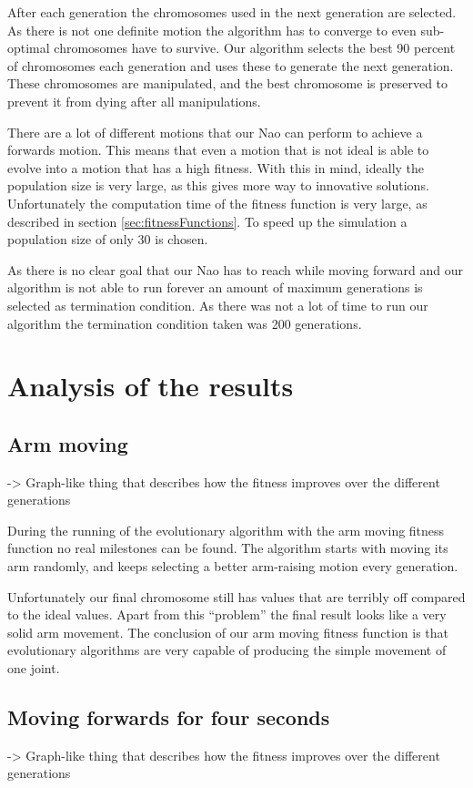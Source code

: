 \documentclass[a4paper,10pt]{article}
\begin{document}
After each generation the chromosomes used in the next generation are selected. As there is not one definite motion the algorithm has to converge to even sub-optimal chromosomes have to survive. Our algorithm selects the best 90 percent of chromosomes each generation and uses these to generate the next generation. These chromosomes are manipulated, and the best chromosome is preserved to prevent it from dying after all manipulations. 

There are a lot of different motions that our Nao can perform to achieve a forwards motion. This means that even a motion that is not ideal is able to evolve into a motion that has a high fitness. With this in mind, ideally the population size is very large, as this gives more way to innovative solutions. Unfortunately the computation time of the fitness function is very large, as described in section \ref{sec:fitnessFunctions}. To speed up the simulation a population size of only 30 is chosen. 

As there is no clear goal that our Nao has to reach while moving forward and our algorithm is not able to run forever an amount of maximum generations is selected as termination condition. As there was not a lot of time to run our algorithm the termination condition taken was 200 generations. 


\section{Analysis of the results}
\label{sec:analysisOfTheResults}
\subsection{Arm moving}
\label{sec:resultsJGapArmMoving}
-> Graph-like thing that describes how the fitness improves over the different generations

During the running of the evolutionary algorithm with the arm moving fitness function no real milestones can be found. The algorithm starts with moving its arm randomly, and keeps selecting a better arm-raising motion every generation. 

Unfortunately our final chromosome still has values that are terribly off compared to the ideal values. Apart from this “problem” the final result looks like a very solid arm movement. The conclusion of our arm moving fitness function is that evolutionary algorithms are very capable of producing the simple movement of one joint. 

\subsection{Moving forwards for four seconds}
\label{sec:resultsJGapForwardsMoving}
-> Graph-like thing that describes how the fitness improves over the different generations
\end{document}
